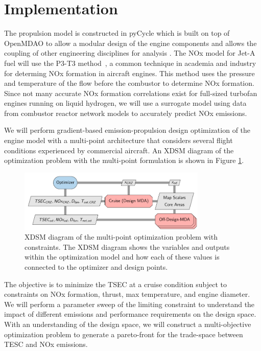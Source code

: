 \documentclass[conf]{new-aiaa}
\begin{document}
\section{Implementation}
\label{sec:imp}
The propulsion model is constructed in pyCycle which is built on top of OpenMDAO to allow a modular design of the engine components and allows the coupling of other engineering disciplines for analysis \cite{Gray2019a}.
The NOx model for Jet-A fuel will use the P3-T3 method~\cite{Dubois2006}, a common technique in academia and industry for determing NOx formation in aircraft engines.
This method uses the pressure and temperature of the flow before the combustor to determine NOx formation.
Since not many accurate NOx formation correlations exist for full-sized turbofan engines running on liquid hydrogen, we will use a surrogate model using data from combustor reactor network models to accurately predict NOx emissions.

We will perform gradient-based emission-propulsion design optimization of the engine model with a multi-point architecture that considers several flight conditions experienced by commercial aircraft.
An XDSM diagram of the optimization problem with the multi-point formulation is shown in Figure \ref{fig:opt_prob}.

\begin{figure}[H]
	\centering
	\includegraphics[width=0.8\textwidth]{N3_inject.pdf}
	\caption{XDSM diagram of the multi-point optimization problem with constraints.
		The XDSM diagram shows the variables and outputs within the optimization model and how each of these values is connected to the optimizer and design points.}
	\label{fig:opt_prob}
\end{figure}

The objective is to minimize the TSEC at a cruise condition subject to constraints on NOx formation, thrust, max temperature, and engine diameter.
We will perform a parameter sweep of the limiting constraint to understand the impact of different emissions and performance requirements on the design space.
With an understanding of the design space, we will construct a multi-objective optimization problem to generate a pareto-front for the trade-space between TESC and NOx emissions.
\end{document}
